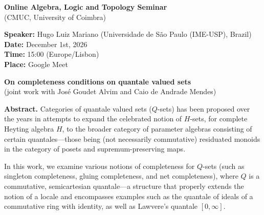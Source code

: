 \documentclass[11pt,a4paper]{article}
\begin{document}
\begin{center}
{\Large\bfseries Online Algebra, Logic and Topology Seminar}\\[4pt]
{\large (CMUC, University of Coimbra)}
\end{center}

\vspace{1em}
\textbf{Speaker:} Hugo Luiz Mariano (Universidade de S\~ao Paulo (IME-USP), Brazil)\\
\textbf{Date:} December 1st, 2026\\
\textbf{Time:} 15:00 (Europe/Lisbon)\\
\textbf{Place:} Google Meet

\vspace{1.5em}
\begin{center}
{\Large\bfseries On completeness conditions on quantale valued sets}\\[6pt]
(joint work with Jos\'e Goudet Alvim and Caio de Andrade Mendes)
\end{center}
\vspace{1em}

\textbf{Abstract.} Categories of quantale valued sets ($Q$-sets) has been proposed over the years in attempts to expand the celebrated notion of $H$-sets, for complete Heyting algebra $H$, to the broader category of parameter algebras consisting of certain quantales---those being (not necessarily commutative) residuated monoids in the category of posets and supremum-preserving maps.

\medskip
In this work, we examine various notions of completeness for $Q$-sets (such as singleton completeness, gluing completeness, and net completeness), where $Q$ is a commutative, semicartesian quantale---a structure that properly extends the notion of a locale and encompasses examples such as the quantale of ideals of a commutative ring with identity, as well as Lawvere's quantale $[0,\infty]$.
\end{document}
